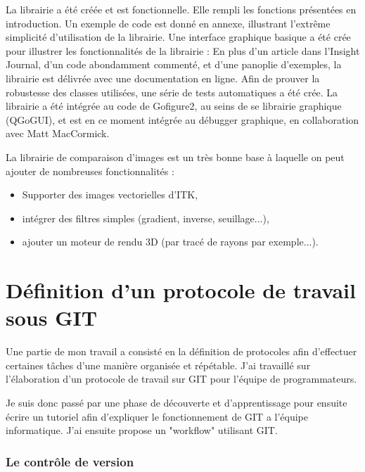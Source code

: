 La librairie a été créée et est fonctionnelle. Elle rempli les fonctions présentées en introduction. Un exemple de code est donné en annexe, illustrant l'extrême simplicité d'utilisation de la librairie.
Une interface graphique basique a été crée pour illustrer les fonctionnalités de la librairie :
En plus d'un article dans l'Insight Journal, d'un code abondamment commenté, et d'une panoplie d'exemples,
la librairie est délivrée avec une documentation en ligne.
Afin de prouver la robustesse des classes utilisées, une série de tests automatiques a été crée.
La librairie a été intégrée au code de Gofigure2, au seins de se librairie graphique (QGoGUI), et est en ce moment intégrée au débugger graphique, en collaboration avec Matt MacCormick.

La librairie de comparaison d'images est un très bonne base à laquelle on peut ajouter de nombreuses fonctionnalités :
\begin{itemize}
  \item Supporter des images vectorielles d'ITK,
  \item intégrer des filtres simples (gradient, inverse, seuillage...),
  \item ajouter un moteur de rendu 3D (par tracé de rayons par exemple...).
\end{itemize}








\section{Définition d'un protocole de travail sous GIT}

Une partie de mon travail a consisté en la définition de protocoles 
afin d'effectuer certaines tâches d'une manière organisée et répétable. 
J'ai travaillé sur l'élaboration d'un protocole de travail sur GIT pour l'équipe de programmateurs.

Je suis donc passé par une phase de découverte et d'apprentissage pour ensuite écrire un tutoriel 
afin d'expliquer le fonctionnement de GIT a l'équipe informatique. 
J'ai ensuite propose un "workflow" utilisant GIT.

\subsubsection{Le contrôle de version}

